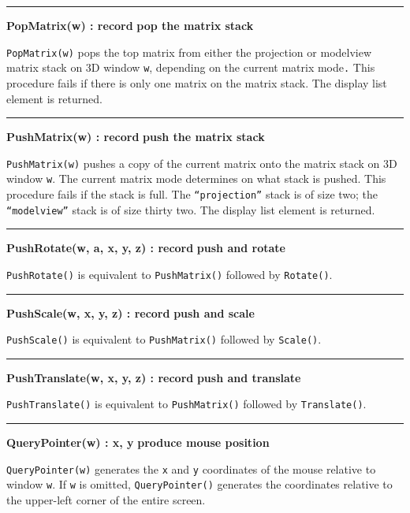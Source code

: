 \bigskip\hrule\vspace{0.1cm}
\noindent
{\bf PopMatrix(w) : record } \hfill {\bf pop the matrix stack}

\noindent
\texttt{PopMatrix(w)} pops the top matrix from either the projection or
modelview matrix stack on 3D window \texttt{w}, depending on the
current matrix mode\texttt{.} This procedure fails if there is only one
matrix on the matrix stack. The display list element is returned. 

\bigskip\hrule\vspace{0.1cm}
\noindent
{\bf PushMatrix(w) : record } \hfill {\bf push the matrix stack}

\noindent
\texttt{PushMatrix(w)} pushes a copy of the current matrix onto the
matrix stack on 3D window \texttt{w}. The current matrix mode
determines on what stack is pushed. This procedure fails if the stack
is full. The \texttt{{\textquotedblleft}projection{\textquotedblright}}
stack is of size two; the
\texttt{{\textquotedblleft}modelview{\textquotedblright}} stack is of
size thirty two. The display list element is returned.

\bigskip\hrule\vspace{0.1cm}
\noindent
{\bf PushRotate(w, a, x, y, z) : record } \hfill {\bf push and rotate}

\noindent
\texttt{PushRotate()} is equivalent to \texttt{PushMatrix()} followed by
\texttt{Rotate()}.

\bigskip\hrule\vspace{0.1cm}
\noindent
{\bf PushScale(w, x, y, z) : record } \hfill {\bf push and scale}

\noindent
\texttt{PushScale()} is equivalent to \texttt{PushMatrix()} followed
by \texttt{Scale()}.

\bigskip\hrule\vspace{0.1cm}
\noindent
{\bf PushTranslate(w, x, y, z) : record } \hfill {\bf push and translate}

\noindent
\texttt{PushTranslate()} is equivalent to \texttt{PushMatrix()} followed
by \texttt{Translate()}.

\bigskip\hrule\vspace{0.1cm}
\noindent
{\bf QueryPointer(w) : x, y } \hfill {\bf produce mouse position}

\noindent
\texttt{QueryPointer(w)} generates the \texttt{x} and \texttt{y}
coordinates of the mouse relative to window \texttt{w}. If \texttt{w}
is omitted, \texttt{QueryPointer()} generates the coordinates relative
to the upper-left corner of the entire screen.

